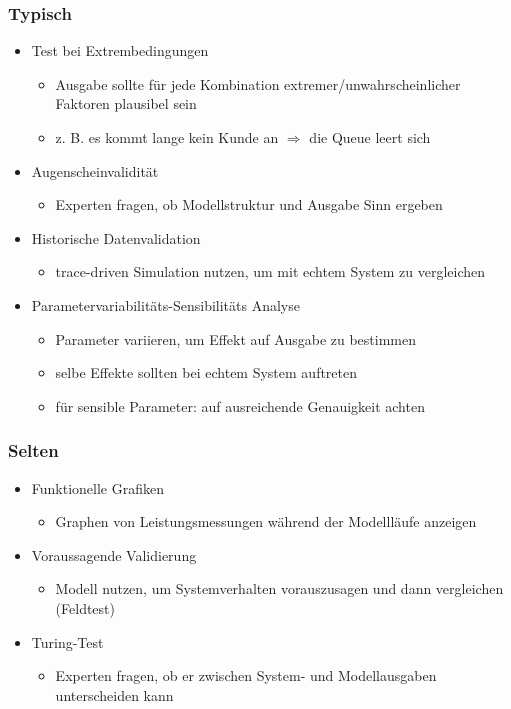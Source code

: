 \documentclass[nonacm=true, language=german]{acmart}
\begin{document}
\subsubsection{Typisch}

\begin{itemize}
    \item Test bei Extrembedingungen
    \begin{itemize}
        \item Ausgabe sollte für jede Kombination extremer/unwahrscheinlicher Faktoren plausibel sein
        \item z. B. es kommt lange kein Kunde an $\Rightarrow$ die Queue leert sich
    \end{itemize}
    \item Augenscheinvalidität
    \begin{itemize}
        \item Experten fragen, ob Modellstruktur und Ausgabe Sinn ergeben
    \end{itemize}
    \item Historische Datenvalidation
    \begin{itemize}
        \item trace-driven Simulation nutzen, um mit echtem System zu vergleichen
    \end{itemize}
    \item Parametervariabilitäts-Sensibilitäts Analyse
    \begin{itemize}
        \item Parameter variieren, um Effekt auf Ausgabe zu bestimmen
        \item selbe Effekte sollten bei echtem System auftreten
        \item für sensible Parameter: auf ausreichende Genauigkeit achten
    \end{itemize}
\end{itemize}

\subsubsection{Selten}

\begin{itemize}
    \item Funktionelle Grafiken
    \begin{itemize}
        \item Graphen von Leistungsmessungen während der Modellläufe anzeigen
    \end{itemize}
    \item Voraussagende Validierung
    \begin{itemize}
        \item Modell nutzen, um Systemverhalten vorauszusagen und dann vergleichen (Feldtest)
    \end{itemize}
    \item Turing-Test
    \begin{itemize}
        \item Experten fragen, ob er zwischen System- und Modellausgaben unterscheiden kann
    \end{itemize}
\end{itemize}
\end{document}
